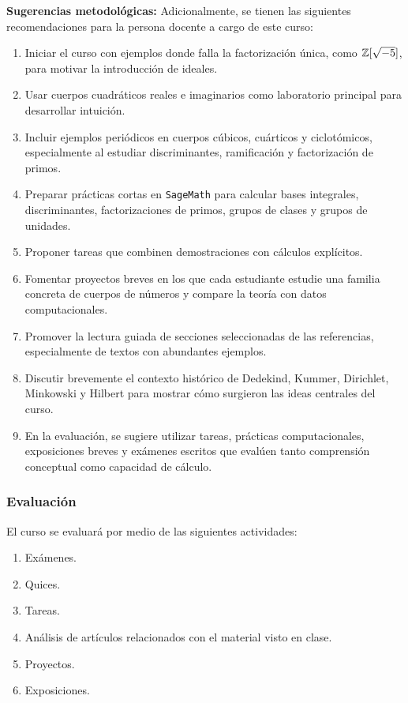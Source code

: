 \begin{refsection}
\textbf{Sugerencias metodológicas:} Adicionalmente, se tienen las siguientes recomendaciones para la persona docente a cargo de este curso:
\begin{enumerate}
    \item Iniciar el curso con ejemplos donde falla la factorización única, como $\mathbb{Z}[\sqrt{-5}]$, para motivar la introducción de ideales.
    \item Usar cuerpos cuadráticos reales e imaginarios como laboratorio principal para desarrollar intuición.
    \item Incluir ejemplos periódicos en cuerpos cúbicos, cuárticos y ciclotómicos, especialmente al estudiar discriminantes, ramificación y factorización de primos.
    \item Preparar prácticas cortas en \texttt{SageMath} para calcular bases integrales, discriminantes, factorizaciones de primos, grupos de clases y grupos de unidades.
    \item Proponer tareas que combinen demostraciones con cálculos explícitos.
    \item Fomentar proyectos breves en los que cada estudiante estudie una familia concreta de cuerpos de números y compare la teoría con datos computacionales.
    \item Promover la lectura guiada de secciones seleccionadas de las referencias, especialmente de textos con abundantes ejemplos.
    \item Discutir brevemente el contexto histórico de Dedekind, Kummer, Dirichlet, Minkowski y Hilbert para mostrar cómo surgieron las ideas centrales del curso.
    \item En la evaluación, se sugiere utilizar tareas, prácticas computacionales, exposiciones breves y exámenes escritos que evalúen tanto comprensión conceptual como capacidad de cálculo.
\end{enumerate}



\subsubsection*{Evaluación}

El curso se evaluará por medio de las siguientes actividades:

\begin{enumerate}
\item Exámenes.
\item Quices.
\item Tareas.
\item Análisis de artículos relacionados con el material visto en clase.
\item Proyectos.
\item Exposiciones.
\end{enumerate}


\end{refsection}
